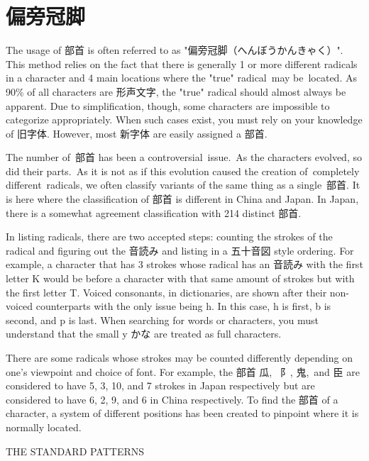 \section{偏旁冠脚}
 
\par{ The usage of 部首 is often referred to as "偏旁冠脚（へんぼうかんきゃく）". This method relies on the fact that there is generally 1 or more different radicals in a character and 4 main locations where the "true" radical may be located. As 90\% of all characters are 形声文字, the "true" radical should almost always be apparent. Due to simplification, though, some characters are impossible to categorize appropriately. When such cases exist, you must rely on your knowledge of 旧字体. However, most 新字体 are easily assigned a 部首. }

\par{The number of 部首 has been a controversial issue. As the characters evolved, so did their parts. As it is not as if this evolution caused the creation of completely different radicals, we often classify variants of the same thing as a single 部首. It is here where the classification of 部首 is different in China and Japan. In Japan, there is a somewhat agreement classification with 214 distinct 部首. }

\par{In listing radicals, there are two accepted steps: counting the strokes of the radical and figuring out the 音読み and listing in a 五十音図 style ordering. For example, a character that has 3 strokes whose radical has an 音読み with the first letter K would be before a character with that same amount of strokes but with the first letter T. Voiced consonants, in dictionaries, are shown after their non-voiced counterparts with the only issue being h. In this case, h is first, b is second, and p is last. When searching for words or characters, you must understand that the small y かな are treated as full characters. }

\par{There are some radicals whose strokes may be counted differently depending on one's viewpoint and choice of font. For example, the 部首 瓜,  阝, 鬼, and 臣 are considered to have 5, 3, 10, and 7 strokes in Japan respectively but are considered to have 6, 2, 9, and 6 in China respectively. To find the 部首 of a character, a system of different positions has been created to pinpoint where it is normally located. }

\begin{center}
 THE STANDARD PATTERNS 
\end{center}

